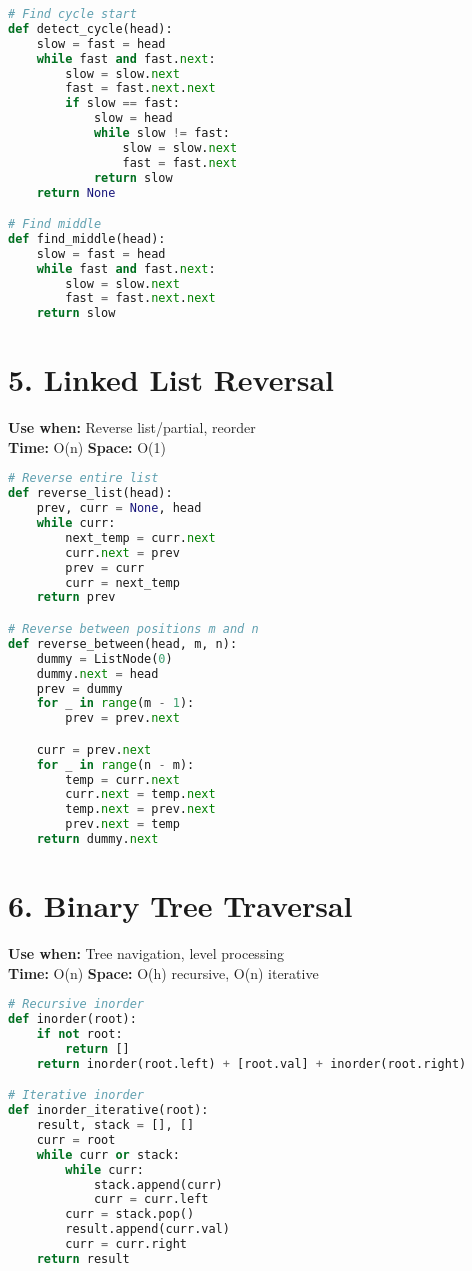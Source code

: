 \documentclass[8pt,landscape]{article}
\begin{document}
\begin{multicols}{3}
\begin{lstlisting}[language=Python]
# Find cycle start
def detect_cycle(head):
    slow = fast = head
    while fast and fast.next:
        slow = slow.next
        fast = fast.next.next
        if slow == fast:
            slow = head
            while slow != fast:
                slow = slow.next
                fast = fast.next
            return slow
    return None

# Find middle
def find_middle(head):
    slow = fast = head
    while fast and fast.next:
        slow = slow.next
        fast = fast.next.next
    return slow
\end{lstlisting}

\section*{5. Linked List Reversal}
\textbf{Use when:} Reverse list/partial, reorder \\
\textbf{Time:} O(n) \quad \textbf{Space:} O(1)
\begin{lstlisting}[language=Python]
# Reverse entire list
def reverse_list(head):
    prev, curr = None, head
    while curr:
        next_temp = curr.next
        curr.next = prev
        prev = curr
        curr = next_temp
    return prev

# Reverse between positions m and n
def reverse_between(head, m, n):
    dummy = ListNode(0)
    dummy.next = head
    prev = dummy
    for _ in range(m - 1):
        prev = prev.next

    curr = prev.next
    for _ in range(n - m):
        temp = curr.next
        curr.next = temp.next
        temp.next = prev.next
        prev.next = temp
    return dummy.next
\end{lstlisting}

\section*{6. Binary Tree Traversal}
\textbf{Use when:} Tree navigation, level processing \\
\textbf{Time:} O(n) \quad \textbf{Space:} O(h) recursive, O(n) iterative
\begin{lstlisting}[language=Python]
# Recursive inorder
def inorder(root):
    if not root:
        return []
    return inorder(root.left) + [root.val] + inorder(root.right)

# Iterative inorder
def inorder_iterative(root):
    result, stack = [], []
    curr = root
    while curr or stack:
        while curr:
            stack.append(curr)
            curr = curr.left
        curr = stack.pop()
        result.append(curr.val)
        curr = curr.right
    return result


\end{lstlisting}
\end{multicols}
\end{document}
